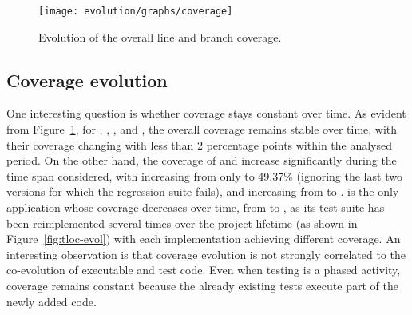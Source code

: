 \begin{figure}[t]
\centering
\texttt{[image: evolution/graphs/coverage]}
\caption{Evolution of the overall line and branch coverage.}
\label{fig:coverage}
\end{figure}




\subsection{Coverage evolution}

One interesting question is whether coverage stays constant over time.
As evident from Figure~\ref{fig:coverage}, for \binutils, \git,
\memcached, and \redis, the overall coverage remains stable over time,
with their coverage changing with less than 2 percentage points within
the analysed period. On the other hand, the coverage of
\lighttpdtwo and \zeromq increase significantly during the time span
considered, with \lighttpdtwo increasing from only
\lighttpdtwoInitialCoverage to 49.37\% (ignoring the last two
versions for which the regression suite fails), and \zeromq increasing
from \zeromqInitialCoverage to \zeromqFinalCoverage. \beanstalkd is the only
application whose coverage decreases over time, from \beanstalkdInitialCoverage
to \beanstalkdFinalCoverage, as its test suite has been reimplemented several
times over the project lifetime (as shown in Figure~\ref{fig:tloc-evol}) with
each implementation achieving different coverage. An interesting observation is
that coverage evolution is not strongly correlated to the co-evolution of
executable and test code. Even when testing is a phased activity, coverage
remains constant because the already existing tests execute part of the newly
added code.

